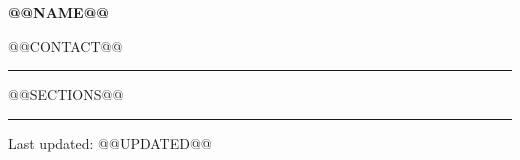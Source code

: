 \documentclass[11pt,a4paper]{article}
\begin{document}
\thispagestyle{firstpage}
\begin{center}
  {\LARGE\bfseries @@NAME@@}\par\vspace{4pt}
  {\small @@CONTACT@@}
\end{center}
\vspace{-1pt}\hrule\vspace{3pt}
@@SECTIONS@@
\par\addvspace{10pt}\hrule\vspace{5pt}
{\footnotesize Last updated: @@UPDATED@@}
\end{document}
